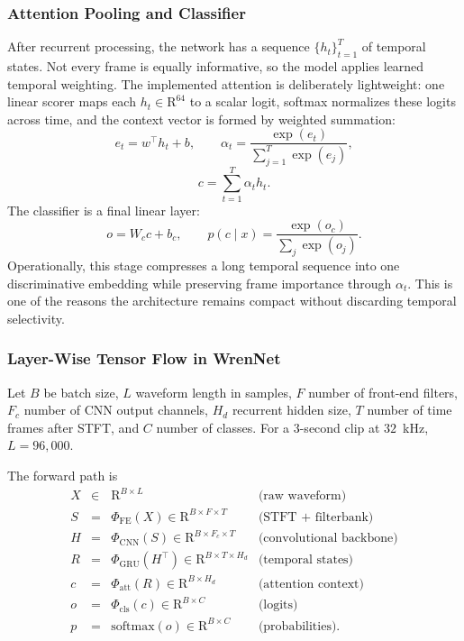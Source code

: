 \documentclass[a4paper,singleside,12pt]{report} %
\begin{document}
	\subsubsection{Attention Pooling and Classifier}
	After recurrent processing, the network has a sequence \(\{h_t\}_{t=1}^{T}\) of temporal states. Not every frame is equally informative, so the model applies learned temporal weighting. The implemented attention is deliberately lightweight: one linear scorer maps each \(h_t\in\mathrm{R}^{64}\) to a scalar logit, softmax normalizes these logits across time, and the context vector is formed by weighted summation:
	\begin{equation}
		e_t = w^\top h_t + b, \qquad
		\alpha_t = \frac{\exp(e_t)}{\sum_{j=1}^{T}\exp(e_j)},
	\end{equation}
	\begin{equation}
		c = \sum_{t=1}^{T}\alpha_t h_t.
	\end{equation}
	The classifier is a final linear layer:
	\begin{equation}
		o = W_c c + b_c, \qquad
		p(c \mid x)=\frac{\exp(o_c)}{\sum_j \exp(o_j)}.
	\end{equation}
	Operationally, this stage compresses a long temporal sequence into one discriminative embedding while preserving frame importance through \(\alpha_t\). This is one of the reasons the architecture remains compact without discarding temporal selectivity.

	\subsubsection{Layer-Wise Tensor Flow in WrenNet}
	Let \(B\) be batch size, \(L\) waveform length in samples, \(F\) number of front-end filters, \(F_c\) number of CNN output channels, \(H_d\) recurrent hidden size, \(T\) number of time frames after STFT, and \(C\) number of classes. For a \(3\)-second clip at \(32\)~kHz, \(L=96{,}000\).

	The forward path is
	\begin{equation}
		\begin{array}{rcll}
			X &\in& \mathrm{R}^{B\times L} & \mbox{(raw waveform)}\\
			S &=& \Phi_{\mathrm{FE}}(X) \in \mathrm{R}^{B\times F\times T} & \mbox{(STFT + filterbank)}\\
			H &=& \Phi_{\mathrm{CNN}}(S) \in \mathrm{R}^{B\times F_c\times T} & \mbox{(convolutional backbone)}\\
			R &=& \Phi_{\mathrm{GRU}}\!\left(H^{\top}\right) \in \mathrm{R}^{B\times T\times H_d} & \mbox{(temporal states)}\\
			c &=& \Phi_{\mathrm{att}}(R) \in \mathrm{R}^{B\times H_d} & \mbox{(attention context)}\\
			o &=& \Phi_{\mathrm{cls}}(c) \in \mathrm{R}^{B\times C} & \mbox{(logits)}\\
			p &=& \mathrm{softmax}(o) \in \mathrm{R}^{B\times C} & \mbox{(probabilities).}
		\end{array}
	\end{equation}
\end{document}
